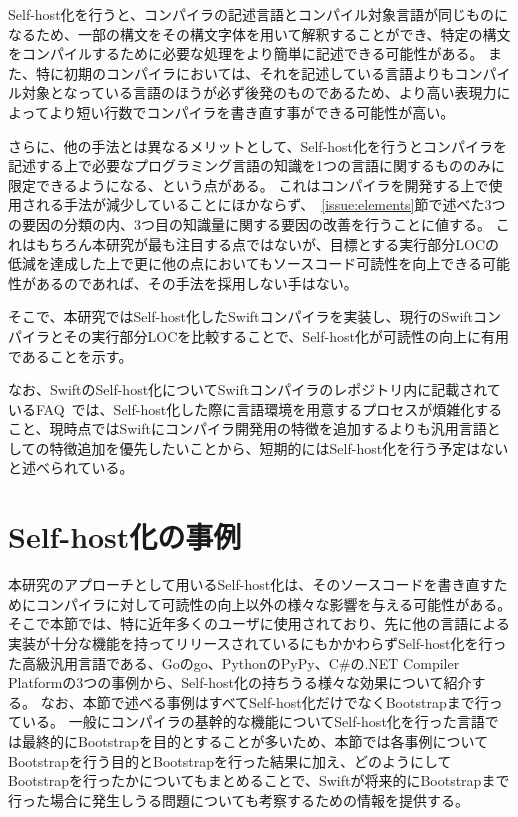 Self-host化を行うと、コンパイラの記述言語とコンパイル対象言語が同じものになるため、一部の構文をその構文字体を用いて解釈することができ、特定の構文をコンパイルするために必要な処理をより簡単に記述できる可能性がある。
また、特に初期のコンパイラにおいては、それを記述している言語よりもコンパイル対象となっている言語のほうが必ず後発のものであるため、より高い表現力によってより短い行数でコンパイラを書き直す事ができる可能性が高い。

さらに、他の手法とは異なるメリットとして、Self-host化を行うとコンパイラを記述する上で必要なプログラミング言語の知識を1つの言語に関するもののみに限定できるようになる、という点がある。
これはコンパイラを開発する上で使用される手法が減少していることにほかならず、~\ref{issue:elements}節で述べた3つの要因の分類の内、3つ目の知識量に関する要因の改善を行うことに値する。
これはもちろん本研究が最も注目する点ではないが、目標とする実行部分LOCの低減を達成した上で更に他の点においてもソースコード可読性を向上できる可能性があるのであれば、その手法を採用しない手はない。

そこで、本研究ではSelf-host化したSwiftコンパイラを実装し、現行のSwiftコンパイラとその実行部分LOCを比較することで、Self-host化が可読性の向上に有用であることを示す。

なお、SwiftのSelf-host化についてSwiftコンパイラのレポジトリ内に記載されているFAQ~\cite{swift-faq}では、Self-host化した際に言語環境を用意するプロセスが煩雑化すること、現時点ではSwiftにコンパイラ開発用の特徴を追加するよりも汎用言語としての特徴追加を優先したいことから、短期的にはSelf-host化を行う予定はないと述べられている。

\section{Self-host化の事例}
\label{side-effect:instance}

本研究のアプローチとして用いるSelf-host化は、そのソースコードを書き直すためにコンパイラに対して可読性の向上以外の様々な影響を与える可能性がある。
そこで本節では、特に近年多くのユーザに使用されており、先に他の言語による実装が十分な機能を持ってリリースされているにもかかわらずSelf-host化を行った高級汎用言語である、Goのgo、PythonのPyPy、C\#の.NET Compiler Platformの3つの事例から、Self-host化の持ちうる様々な効果について紹介する。
なお、本節で述べる事例はすべてSelf-host化だけでなくBootstrapまで行っている。
一般にコンパイラの基幹的な機能についてSelf-host化を行った言語では最終的にBootstrapを目的とすることが多いため、本節では各事例についてBootstrapを行う目的とBootstrapを行った結果に加え、どのようにしてBootstrapを行ったかについてもまとめることで、Swiftが将来的にBootstrapまで行った場合に発生しうる問題についても考察するための情報を提供する。

